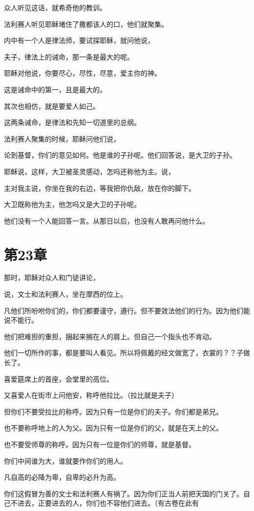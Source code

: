 \documentclass[12pt,oneside]{book}
\begin{document}
众人听见这话，就希奇他的教训。

法利赛人听见耶稣堵住了撒都该人的口，他们就聚集。

内中有一个人是律法师，要试探耶稣，就问他说，

夫子，律法上的诫命，那一条是最大的呢。

耶稣对他说，你要尽心，尽性，尽意，爱主你的神。

这是诫命中的第一，且是最大的。

其次也相仿，就是要爱人如己。

这两条诫命，是律法和先知一切道里的总纲。

法利赛人聚集的时候，耶稣问他们说，

论到基督，你们的意见如何。他是谁的子孙呢。他们回答说，是大卫的子孙。

耶稣说，这样，大卫被圣灵感动，怎吗还称他为主。说，

主对我主说，你坐在我的右边，等我把你仇敌，放在你的脚下。

大卫既称他为主，他怎吗又是大卫的子孙呢。

他们没有一个人能回答一言。从那日以后，也没有人敢再问他什么。

\chapter{第23章}
那时，耶稣对众人和门徒讲论，

说，文士和法利赛人，坐在摩西的位上。

凡他们所吩咐你们的，你们都要谨守，遵行。但不要效法他们的行为。因为他们能说不能行。

他们把难担的重担，捆起来搁在人的肩上。但自己一个指头也不肯动。

他们一切所作的事，都是要叫人看见。所以将佩戴的经文做宽了，衣裳的？？子做长了。

喜爱筵席上的首座，会堂里的高位。

又喜爱人在街市上问他安，称呼他拉比。（拉比就是夫子）

但你们不要受拉比的称呼。因为只有一位是你们的夫子。你们都是弟兄。

也不要称呼地上的人为父。因为只有一位是你们的父，就是在天上的父。

也不要受师尊的称呼。因为只有一位是你们的师尊，就是基督。

你们中间谁为大，谁就要作你们的用人。

凡自高的必降为卑，自卑的必升为高。

你们这假冒为善的文士和法利赛人有祸了。因为你们正当人前把天国的门关了。自己不进去，正要进去的人，你们也不容他们进去。（有古卷在此有
\end{document}
